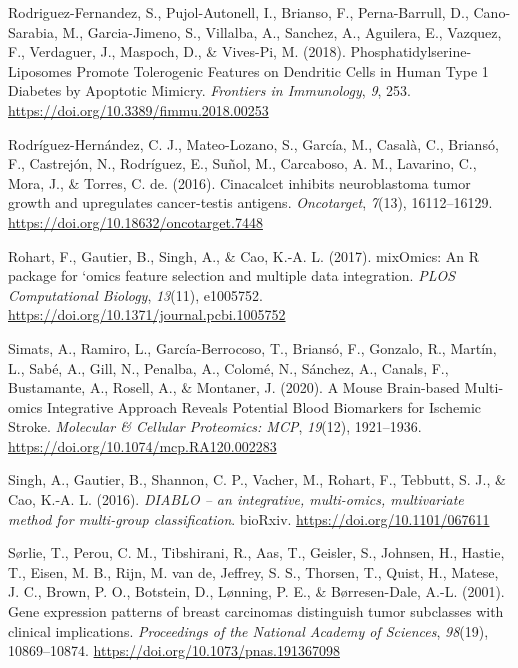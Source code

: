 \documentclass[a4paper, nobind]{templates/ociamthesis}
\newlength{\cslhangindent}
\newenvironment{CSLReferences}[2] %
 {%
  \setlength{\parindent}{0pt}
  \ifodd #1
  \let\oldpar\par
  \def\par{\hangindent=\cslhangindent\oldpar}
  \fi
  \setlength{\parskip}{1mm}
  \setlength{\baselineskip}{6mm}
 }%
 {}
\begin{document}
\begin{CSLReferences}{1}{0}
\leavevmode{}%
Rodriguez-Fernandez, S., Pujol-Autonell, I., Brianso, F., Perna-Barrull, D., Cano-Sarabia, M., Garcia-Jimeno, S., Villalba, A., Sanchez, A., Aguilera, E., Vazquez, F., Verdaguer, J., Maspoch, D., \& Vives-Pi, M. (2018). Phosphatidylserine-{Liposomes} {Promote} {Tolerogenic} {Features} on {Dendritic} {Cells} in {Human} {Type} 1 {Diabetes} by {Apoptotic} {Mimicry}. \emph{Frontiers in Immunology}, \emph{9}, 253. \url{https://doi.org/10.3389/fimmu.2018.00253}

\leavevmode{}%
Rodríguez-Hernández, C. J., Mateo-Lozano, S., García, M., Casalà, C., Briansó, F., Castrejón, N., Rodríguez, E., Suñol, M., Carcaboso, A. M., Lavarino, C., Mora, J., \& Torres, C. de. (2016). Cinacalcet inhibits neuroblastoma tumor growth and upregulates cancer-testis antigens. \emph{Oncotarget}, \emph{7}(13), 16112--16129. \url{https://doi.org/10.18632/oncotarget.7448}

\leavevmode{}%
Rohart, F., Gautier, B., Singh, A., \& Cao, K.-A. L. (2017). {mixOmics}: {An} {R} package for `omics feature selection and multiple data integration. \emph{PLOS Computational Biology}, \emph{13}(11), e1005752. \url{https://doi.org/10.1371/journal.pcbi.1005752}

\leavevmode{}%
Simats, A., Ramiro, L., García-Berrocoso, T., Briansó, F., Gonzalo, R., Martín, L., Sabé, A., Gill, N., Penalba, A., Colomé, N., Sánchez, A., Canals, F., Bustamante, A., Rosell, A., \& Montaner, J. (2020). A {Mouse} {Brain}-based {Multi}-omics {Integrative} {Approach} {Reveals} {Potential} {Blood} {Biomarkers} for {Ischemic} {Stroke}. \emph{Molecular \& Cellular Proteomics: MCP}, \emph{19}(12), 1921--1936. \url{https://doi.org/10.1074/mcp.RA120.002283}

\leavevmode{}%
Singh, A., Gautier, B., Shannon, C. P., Vacher, M., Rohart, F., Tebbutt, S. J., \& Cao, K.-A. L. (2016). \emph{{DIABLO} -- an integrative, multi-omics, multivariate method for multi-group classification}. bioRxiv. \url{https://doi.org/10.1101/067611}

\leavevmode{}%
Sørlie, T., Perou, C. M., Tibshirani, R., Aas, T., Geisler, S., Johnsen, H., Hastie, T., Eisen, M. B., Rijn, M. van de, Jeffrey, S. S., Thorsen, T., Quist, H., Matese, J. C., Brown, P. O., Botstein, D., Lønning, P. E., \& Børresen-Dale, A.-L. (2001). Gene expression patterns of breast carcinomas distinguish tumor subclasses with clinical implications. \emph{Proceedings of the National Academy of Sciences}, \emph{98}(19), 10869--10874. \url{https://doi.org/10.1073/pnas.191367098}


\end{CSLReferences}
\end{document}
